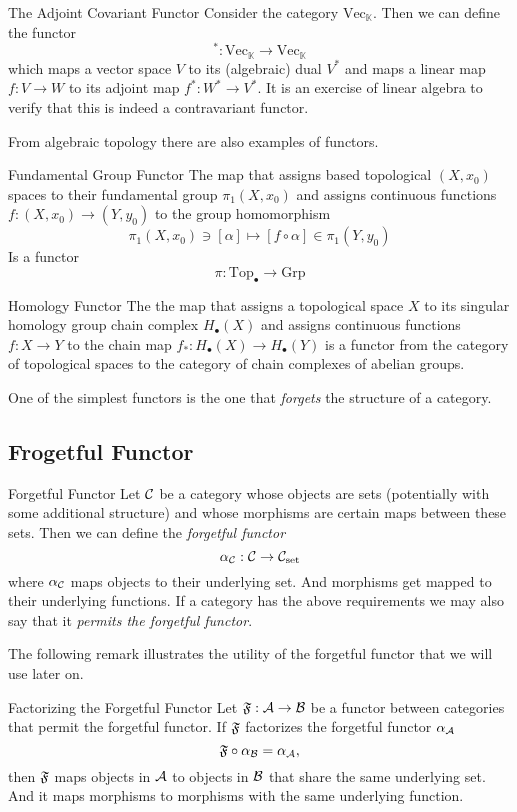 \begin{example}{The Adjoint Covariant Functor}{}
Consider the category $\mathrm{Vec}_\mathbb{K}$. Then we can define the functor
$$
^* : \mathrm{Vec}_\mathbb{K} \to \mathrm{Vec}_\mathbb{K}
$$
which maps a vector space $V$ to its (algebraic) dual $V^*$ and maps a linear map $f: V \to W$ to its adjoint map $f^*: W^* \to V^*$. It is an exercise of linear algebra to verify that this is indeed a contravariant functor.
\end{example}

From algebraic topology there are also examples of functors.
\begin{example}{Fundamental Group Functor}{}
\cite{Hatcher2001}
\todo
The map that assigns based topological $(X,x_0)$ spaces to their fundamental group $\pi_1(X,x_0)$ and assigns continuous functions $f: (X,x_0) \to (Y,y_0)$ to the group homomorphism 
$$
\pi_1(X,x_0) \ni [\alpha] \mapsto [f \circ \alpha] \in \pi_1(Y,y_0)
$$
Is a functor
$$
\pi: \mathrm{Top}_\bullet \to \mathrm{Grp}
$$
\end{example}

\begin{example}{Homology Functor}{}
\cite{Hatcher2001}
\todo
The the map that assigns a topological space $X$ to its singular homology group chain complex $H_\bullet(X)$ and assigns continuous functions $f: X \to Y$ to the chain map $f_*: H_\bullet(X) \to H_\bullet(Y)$ is a functor from the category of topological spaces to the category of chain complexes of abelian groups.
\end{example}


One of the simplest functors is the one that \emph{forgets} the structure of a category.

\subsection{Frogetful Functor}

\begin{definition}{Forgetful Functor}{}
Let $\mathcal{C}$ be a category whose objects are sets (potentially with some additional structure) and whose morphisms are certain maps between these sets. Then we can define the \emph{forgetful functor}
$$
\alpha_{\mathcal{C}}: \mathcal{C} \to \mathcal{C}_\mathrm{set}
$$
where $\alpha_{\mathcal{C}}$ maps objects to their underlying set. And morphisms get mapped to their underlying functions. If a category has the above requirements we may also say that it \emph{permits the forgetful functor}.
\end{definition}
The following remark illustrates the utility of the forgetful functor that we will use later on.
\begin{myremark}{Factorizing the Forgetful Functor}{}
Let $\mathfrak{F}: \mathcal{A} \to \mathcal{B}$ be a functor between categories that permit the forgetful functor. If $\mathfrak{F}$ factorizes the forgetful functor $\alpha_{\mathcal{A}}$ \ie
\begin{equation*}
    \mathfrak{F} \circ \alpha_{\mathcal{B}} = \alpha_{\mathcal{A}},
\end{equation*}
then $\mathfrak{F}$ maps objects in $\mathcal{A}$ to objects in $\mathcal{B}$ that share the same underlying set. And it maps morphisms to morphisms with the same underlying function.
\end{myremark}
